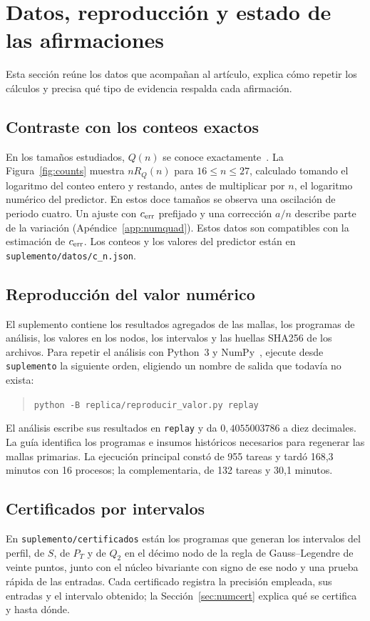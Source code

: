\section{Datos, reproducción y estado de las afirmaciones}\label{sec:datos}
Esta sección reúne los datos que acompañan al artículo, explica cómo repetir los cálculos y
precisa qué tipo de evidencia respalda cada afirmación.

\subsection{Contraste con los conteos exactos}\label{sec:conteos-exactos}
En los tamaños estudiados, $Q(n)$ se conoce exactamente~\cite{oeis,q27}. La
Figura~\ref{fig:counts} muestra $nR_Q(n)$ para $16\le n\le27$, calculado tomando el logaritmo
del conteo entero y restando, antes de multiplicar por $n$, el logaritmo numérico del predictor.
En estos doce tamaños se observa una oscilación de periodo cuatro. Un ajuste con $c_{\mathrm{err}}$ prefijado
y una corrección $a/n$ describe parte de la variación (Apéndice~\ref{app:numquad}). Estos datos
son compatibles con la estimación de $c_{\mathrm{err}}$. Los conteos y los valores del predictor están en
\texttt{suplemento/datos/c\_n.json}.


\subsection{Reproducción del valor numérico}\label{sec:reproduccion}
El suplemento contiene los resultados agregados de las mallas, los programas de análisis,
los valores en los nodos, los intervalos y las huellas SHA256 de los archivos.
Para repetir el análisis con Python~3 y NumPy~\cite{numpy}, ejecute desde \texttt{suplemento} la siguiente
orden,
eligiendo un nombre de salida que todavía no exista:
\begin{quote}
\verb|python -B replica/reproducir_valor.py replay|
\end{quote}
El análisis escribe sus resultados en \texttt{replay} y da $0{,}4055003786$ a diez decimales.
La guía identifica los programas e insumos históricos necesarios para regenerar las mallas primarias.
La ejecución principal constó de 955 tareas y tardó 168,3 minutos con 16 procesos; la
complementaria, de 132 tareas y 30,1 minutos.

\subsection{Certificados por intervalos}
En \texttt{suplemento/certificados} están los programas que generan los intervalos del perfil, de
$S$, de $P_T$ y de $Q_2$ en el décimo nodo de la regla de Gauss--Legendre de veinte puntos, junto
con el núcleo bivariante con signo de ese nodo y una prueba rápida de las entradas. Cada
certificado registra la precisión empleada, sus entradas y el intervalo obtenido; la
Sección~\ref{sec:numcert} explica qué se certifica y hasta dónde.

